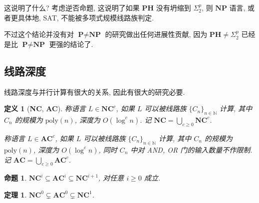 \documentclass[8pt]{article}
\theoremstyle{compact}
\newtheorem{theorem}{定理}[section]
\newtheorem{definition}{定义}[section]
\newtheorem{proposition}{命题}[section]
\def\ge{\geqslant}
\def\P{\textbf{P}}
\def\NP{\textbf{NP}}
\def\PH{\textbf{PH}}
\def\NC{\textbf{NC}}
\def\AC{\textbf{AC}}
\begin{document}
这说明了什么? 考虑逆否命题, 这说明了如果 $\PH$ 没有坍缩到 $\Sigma_2^p$, 则 $\NP$ 语言, 或者更具体地, \textsf{SAT}, 不能被多项式规模线路族判定.

不过这个结论并没有对 $\P \neq \NP$ 的研究做出任何进展性贡献, 因为 $\PH \neq \Sigma_2^p$ 已经是比 $\P \neq \NP$ 更强的结论了.

\subsection{线路深度}
线路深度与并行计算有很大的关系, 因此有很大的研究必要.
\begin{definition}[\NC, \AC]
	称语言 $L \in \NC^c$, 如果 $L$ 可以被线路族 $\{C_n\}_{n \in \mathbb N}$ 计算, 其中 $C_n$ 的规模为 $\text{poly}(n)$, 深度为 $O(\log^cn)$. 记 $\NC = \bigcup_{c \ge 0} \NC^c$.

	称语言 $L \in \AC^c$, 如果 $L$ 可以被线路族 $\{C_n\}_{n \in \mathbb N}$ 计算, 其中 $C_n$ 的规模为 $\text{poly}(n)$, 深度为 $O(\log^cn)$, 同时 $C_n$ 中对 AND, OR 门的输入数量不作限制. 记 $\AC = \bigcup_{c \ge 0} \AC^c$.
\end{definition}
\begin{proposition}
	$\NC^i \subseteq \AC^i \subseteq \NC^{i + 1}$, 对任意 $i \ge 0$ 成立.
\end{proposition}
\begin{theorem}
	$\NC^0 \subsetneq \AC^0 \subsetneq \NC^1$.
\end{theorem}
\end{document}
